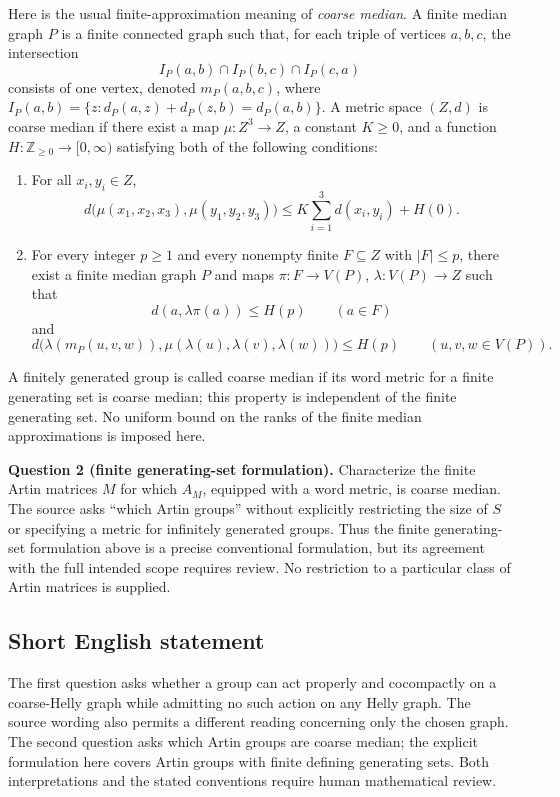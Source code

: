 \documentclass[11pt]{article}
\newcommand{\Z}{\mathbb{Z}}
\begin{document}
Here is the usual finite-approximation meaning of \emph{coarse median}. A finite median graph \(P\) is a finite connected graph such that, for each triple of vertices \(a,b,c\), the intersection
\[
I_P(a,b)\cap I_P(b,c)\cap I_P(c,a)
\]
consists of one vertex, denoted \(m_P(a,b,c)\), where \(I_P(a,b)=\{z:d_P(a,z)+d_P(z,b)=d_P(a,b)\}\). A metric space \((Z,d)\) is coarse median if there exist a map \(\mu:Z^3\to Z\), a constant \(K\ge0\), and a function \(H:\Z_{\ge0}\to[0,\infty)\) satisfying both of the following conditions:
\begin{enumerate}
\item For all \(x_i,y_i\in Z\),
\[
d\bigl(\mu(x_1,x_2,x_3),\mu(y_1,y_2,y_3)\bigr)
\le K\sum_{i=1}^{3}d(x_i,y_i)+H(0).
\]
\item For every integer \(p\ge1\) and every nonempty finite \(F\subseteq Z\) with \(|F|\le p\), there exist a finite median graph \(P\) and maps \(\pi:F\to V(P)\), \(\lambda:V(P)\to Z\) such that
\[
d(a,\lambda\pi(a))\le H(p)\qquad(a\in F)
\]
and
\[
d\bigl(\lambda(m_P(u,v,w)),\mu(\lambda(u),\lambda(v),\lambda(w))\bigr)
\le H(p)\qquad(u,v,w\in V(P)).
\]
\end{enumerate}
A finitely generated group is called coarse median if its word metric for a finite generating set is coarse median; this property is independent of the finite generating set. No uniform bound on the ranks of the finite median approximations is imposed here.

\textbf{Question 2 (finite generating-set formulation).} Characterize the finite Artin matrices \(M\) for which \(A_M\), equipped with a word metric, is coarse median. The source asks ``which Artin groups'' without explicitly restricting the size of \(S\) or specifying a metric for infinitely generated groups. Thus the finite generating-set formulation above is a precise conventional formulation, but its agreement with the full intended scope requires review. No restriction to a particular class of Artin matrices is supplied.
\subsection{Short English statement}
The first question asks whether a group can act properly and cocompactly on a coarse-Helly graph while admitting no such action on any Helly graph. The source wording also permits a different reading concerning only the chosen graph. The second question asks which Artin groups are coarse median; the explicit formulation here covers Artin groups with finite defining generating sets. Both interpretations and the stated conventions require human mathematical review.
\end{document}
